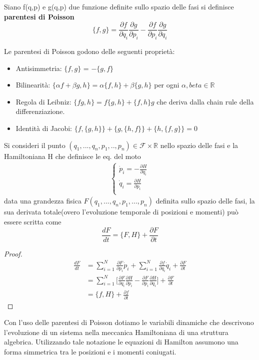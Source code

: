 \begin{definition}
	Siano f(q,p) e g(q,p) due funzione definite sullo spazio delle fasi si definisce \textbf{parentesi di Poisson}
	\begin{equation}
		\{f, g\}=\frac{\partial f}{\partial q_i} \frac{\partial g}{\partial p_i}-\frac{\partial f}{\partial p_i} \frac{\partial g}{\partial q_i}
	\end{equation}
\end{definition}
\noindent Le parentesi di Poisson godono delle seguenti propriet\`{a}:
\begin{itemize}
	\item Antisimmetria: $\{f,g\}$ = $-\{g,f \}$
	\item Bilinearit\`{a}: $\{\alpha f+\beta g, h\}=\alpha\{f, h\}+\beta\{g, h\}$  per ogni $\alpha,beta \in \mathbb{R}$
	\item Regola di Leibniz: $\{f g, h\}=f\{g, h\}+\{f, h\} g$ che deriva dalla chain rule della differenziazione.
	\item Identit\`{a} di Jacobi: $\{f,\{g, h\}\}+\{g,\{h, f\}\}+\{h,\{f, g\}\}=0$
\end{itemize}

\begin{lemma}
	Si consideri il punto $(q_1,...,q_n,p_1,..,p_n)\in \mathcal{F} \times \mathbb{R}$ nello spazio delle fasi e la Hamiltoniana H che definisce le eq. del moto 
\begin{align*}
	\begin{cases}
	\dot{p}_i  =-\frac{\partial H}{\partial q_i} \\
	\dot{q}_i  =\frac{\partial H}{\partial p_i} \\
	\end{cases}	
\end{align*}	
data una grandezza fisica $F(q_1,...,q_n,p_1,...,p_n)$ definita sullo spazio delle fasi, la sua derivata totale(overo l'evoluzione temporale di posizioni e momenti) pu\`{o} essere scritta come 
\begin{equation}
	\dfrac{dF}{dt} = \Big \{F,H \Big\} + \dfrac{\partial F}{\partial t}
\end{equation}
\end{lemma}

\begin{proof}
\begin{align*}
\frac{d F}{d t} & = \sum_{i = 1}^N\frac{\partial F}{\partial p_i} \dot{p}_i+ \sum_{i=1}^N\frac{\partial f}{\partial q_i} \dot{q}_i+\frac{\partial F}{\partial t} \\[0.5em]
& = \sum_{i=1}^N \Big [\frac{\partial F}{\partial q_i} \frac{\partial H}{\partial p_i} -\frac{\partial F}{\partial p_i} \frac{\partial H}{\partial q_i} \Big ] + \frac{\partial F}{\partial t} \\[0.5em]
& =\{f, H\}+\frac{\partial f}{\partial t}
\end{align*}
\end{proof}
\noindent Con l'uso delle parentesi di Poisson dotiamo le variabili dinamiche che descrivono l'evoluzione di un sistema nella meccanica Hamiltoniana di una struttura algebrica. Utilizzando tale notazione le equazioni di Hamilton assumono una forma simmetrica tra le posizioni e i momenti coniugati.

